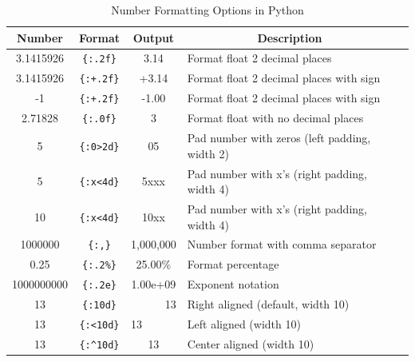 \documentclass[a4paper,11pt]{book}
\begin{document}
\begin{table}[!htbp]
	\centering
	\caption{Number Formatting Options in Python}
	\label{tab:number_formatting}
	\begin{tabular}{cccll}
		\toprule \toprule
		\multicolumn{1}{c}{Number} &
		\multicolumn{1}{c}{Format} & 
		\multicolumn{1}{c}{Output} & 
		\multicolumn{1}{c}{Description} \\
		\midrule
		3.1415926                           & \texttt{\{:.2f\}}                            & 3.14                                & Format float 2 decimal places                 &  \\
		3.1415926                           & \texttt{\{:+.2f\}}                           & +3.14                               & Format float 2 decimal places with sign       &  \\
		-1                                  & \texttt{\{:+.2f\}}                           & -1.00                               & Format float 2 decimal places with sign       &  \\
		2.71828                             & \texttt{\{:.0f\}}                            & 3                                   & Format float with no decimal places           &  \\
		5                                   & \texttt{\{:0\textgreater{}2d\}}              & 05                                  & Pad number with zeros (left padding, width 2) &  \\
		5                                   & \texttt{\{:x\textless{}4d\}}                 & 5xxx                                & Pad number with x’s (right padding, width 4)  &  \\
		10                                  & \texttt{\{:x\textless{}4d\}}                 & 10xx                                & Pad number with x’s (right padding, width 4)  &  \\
		1000000                             & \texttt{\{:,\}}                              & 1,000,000                           & Number format with comma separator            &  \\
		0.25                                & \texttt{\{:.2\%\}}                           & 25.00\%                             & Format percentage                             &  \\
		1000000000                          & \texttt{\{:.2e\}}                            & 1.00e+09                            & Exponent notation                             &  \\
		13                                  & \texttt{\{:10d\}}                            & \multicolumn{1}{r}{13}              & Right aligned (default, width 10)             &  \\
		13                                  & \texttt{\{:\textless{}10d\}}                 & \multicolumn{1}{l}{13}              & Left aligned (width 10)                       &  \\
		13                                  & \texttt{\{:\textasciicircum{}10d\}}          & 13                                  & Center aligned (width 10)                     \\
		\bottomrule
	\end{tabular}
\end{table}
\end{document}
